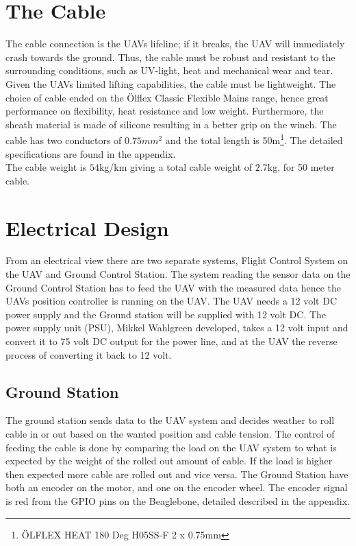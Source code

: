 \section{The Cable}
The cable connection is the UAVs lifeline; if it breaks, the UAV will immediately crash towards the ground. Thus, the cable must be robust and resistant to the surrounding conditions, such as UV-light, heat and mechanical wear and tear.  Given the UAVs limited lifting capabilities, the cable must be lightweight. 
The choice of cable ended on the Ölflex Classic Flexible Mains range, hence great performance on flexibility, heat resistance and low weight. Furthermore, the sheath material is made of silicone resulting in a better grip on the winch. The cable has two conductors of $0.75mm^2$ and the total length is 50m\footnote{ÖLFLEX HEAT 180 Deg H05SS-F 2 x 0.75mm}. The detailed specifications are found in the appendix.\\
The cable weight is $54$kg/km giving a total cable weight of $2.7$kg, for 50 meter cable.


\section{Electrical Design}
From an electrical view there are two separate systems, Flight Control System on the UAV and Ground Control Station. The system reading the sensor data on the Ground Control Station has to feed the UAV with the measured data hence the UAVs position controller is running on the UAV. 
The UAV needs a 12 volt DC power supply and the Ground station will be supplied with 12 volt DC. The power supply unit (PSU), Mikkel Wahlgreen developed, takes a 12 volt input and convert it to 75 volt DC output for the power line, and at the UAV the reverse process of converting it back to 12 volt.

\subsection{Ground Station}
The ground station sends data to the UAV system and decides weather to roll cable in or out based on the wanted position and cable tension. The control of feeding the cable is done by comparing the load on the UAV system to what is expected by the weight of the rolled out amount of cable. If the load is higher then expected more cable are rolled out and vice versa. The Ground Station have both an encoder on the motor, and one on the encoder wheel. The encoder signal is red from the GPIO pins on the Beaglebone, detailed described in the appendix.
  
